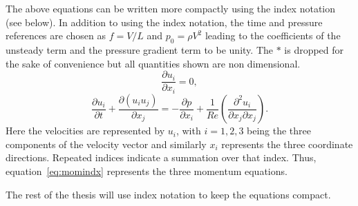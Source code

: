 The above equations can be written more compactly using the index notation (see below). In addition to using the index notation, the time and pressure references are chosen as $f = V/L$ and $p_0 = \rho V^2$ leading to the coefficients of the unsteady term and the pressure gradient term to be unity. The $\ast$ is dropped for the sake of convenience but all quantities shown are non dimensional.
\begin{equation}
\frac{\partial u_i}{\partial x_i} = 0,
\label{eq:contindx}
\end{equation}
\begin{equation}
\frac{\partial u_i}{\partial t} + \frac{\partial (u_iu_j)}{\partial x_j} = -\frac{\partial p}{\partial x_i} + \frac{1}{Re}\left( \frac{\partial^2 u_i}{\partial x_j\partial x_j} \right).
\label{eq:momindx}
\end{equation}
Here the velocities are represented by $u_i$, with $i=1,2,3$ being the three components of the velocity vector and similarly $x_i$ represents the three coordinate directions. Repeated indices indicate a summation over that index. Thus, equation~\ref{eq:momindx} represents the three momentum equations.

The rest of the thesis will use index notation to keep the equations compact.

